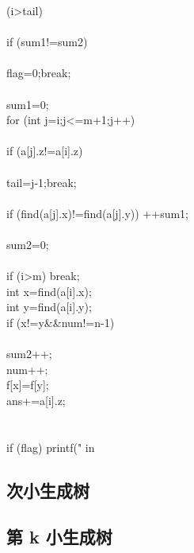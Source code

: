 { (i>tail)\\      {\\        if (sum1!=sum2)\\        {		\\          flag=0;break;\\        }\\        sum1=0;\\        for (int j=i;j<=m+1;j++)\\        {\\          if (a[j].z!=a[i].z) \\          {\\            tail=j-1;break;\\          }\\          if (find(a[j].x)!=find(a[j].y)) ++sum1;\\        }\\        sum2=0;\\      }\\      if (i>m) break;\\      int x=find(a[i].x);\\      int y=find(a[i].y);\\      if (x!=y&&num!=n-1)\\      {\\        sum2++;\\        num++;\\        f[x]=f[y];\\        ans+=a[i].z;\\      }\\    }\\    if (flag) printf("%
 in

\subsection{次小生成树}

\subsection{第 k 小生成树}
